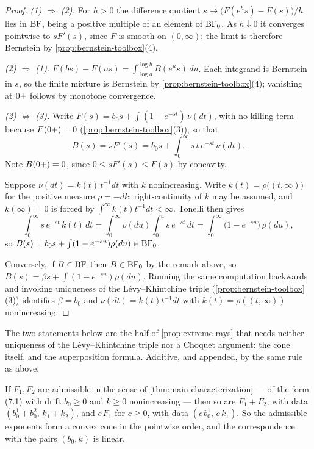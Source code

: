 \begin{proof}
\emph{(1) $\Rightarrow$ (2).} For $h > 0$ the difference quotient
$s \mapsto \bigl(F(e^h s) - F(s)\bigr)/h$ lies in $\mathrm{BF}$, being a positive multiple of an
element of $\mathrm{BF}_0$. As $h \downarrow 0$ it converges pointwise to $sF'(s)$, since $F$ is smooth
on $(0,\infty)$; the limit is therefore Bernstein by \ref{prop:bernstein-toolbox}(4).

\emph{(2) $\Rightarrow$ (1).} $F(bs) - F(as) = \int_{\log a}^{\log b} B(e^u s)\,du$. Each
integrand is Bernstein in $s$, so the finite mixture is Bernstein by
\ref{prop:bernstein-toolbox}(4); vanishing at $0{+}$ follows by monotone convergence.

\emph{(2) $\Leftrightarrow$ (3).} Write $F(s) = b_0 s + \int (1 - e^{-st})\,\nu(dt)$, with no
killing term because $F(0{+}) = 0$ (\ref{prop:bernstein-toolbox}(3)), so that
\[
  B(s) = s F'(s) = b_0 s + \int_0^\infty s\,t\, e^{-st}\, \nu(dt).
\]
Note $B(0{+}) = 0$, since $0 \le sF'(s) \le F(s)$ by concavity.

Suppose $\nu(dt) = k(t)\,t^{-1}dt$ with $k$ nonincreasing. Write $k(t) = \rho\bigl((t,\infty)\bigr)$
for the positive measure $\rho = -dk$; right-continuity of $k$ may be assumed, and
$k(\infty) = 0$ is forced by $\int^\infty k(t)t^{-1}dt < \infty$. Tonelli then gives
\[
  \int_0^\infty s\, e^{-st}\, k(t)\, dt
  = \int_0^\infty \rho(du) \int_0^u s\,e^{-st}\,dt
  = \int_0^\infty \bigl(1 - e^{-su}\bigr)\,\rho(du),
\]
so $B(s) = b_0 s + \int (1 - e^{-su})\rho(du) \in \mathrm{BF}_0$.

Conversely, if $B \in \mathrm{BF}$ then $B \in \mathrm{BF}_0$ by the remark above, so
$B(s) = \beta s + \int (1 - e^{-su})\rho(du)$. Running the same computation backwards and
invoking uniqueness of the Lévy--Khintchine triple (\ref{prop:bernstein-toolbox}(3))
identifies $\beta = b_0$ and $\nu(dt) = k(t)t^{-1}dt$ with $k(t) = \rho((t,\infty))$
nonincreasing.
\end{proof}

\bigskip

The two statements below are the half of \ref{prop:extreme-rays} that needs neither uniqueness of
the L\'evy--Khintchine triple nor a Choquet argument: the cone itself, and the superposition
formula. Additive, and appended, by the same rule as above.

\begin{lemma}\label{lem:admissible-cone}
\leanok
If $F_1, F_2$ are admissible in the sense of \ref{thm:main-characterization} --- of the form
(7.1) with drift $b_0 \ge 0$ and $k \ge 0$ nonincreasing --- then so are $F_1 + F_2$, with data
$(b_0^1 + b_0^2,\, k_1 + k_2)$, and $c\,F_1$ for $c \ge 0$, with data $(c\,b_0^1,\, c\,k_1)$. So
the admissible exponents form a convex cone in the pointwise order, and the correspondence with
the pairs $(b_0,k)$ is linear.
\statusT
\end{lemma}

